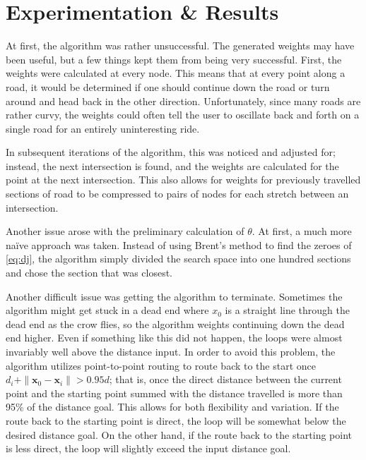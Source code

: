 \documentclass[twocolumn,12pt]{article}
\begin{document}
\section{Experimentation \& Results}

At first, the algorithm was rather unsuccessful. The generated weights may have
been useful, but a few things kept them from being very successful. First, the
weights were calculated at every node. This means that at every point along a
road, it would be determined if one should continue down the road or turn around
and head back in the other direction. Unfortunately, since many roads are rather
curvy, the weights could often tell the user to oscillate back and forth on a
single road for an entirely uninteresting ride.

In subsequent iterations of the algorithm, this was noticed and adjusted for;
instead, the next intersection is found, and the weights are calculated for the
point at the next intersection. This also allows for weights for previously
travelled sections of road to be compressed to pairs of nodes for each stretch
between an intersection.

Another issue arose with the preliminary calculation of $\theta$. At first, a
much more na\"{i}ve approach was taken. Instead of using Brent's method to find
the zeroes of \eqref{eq:dj}, the algorithm simply divided the search space into
one hundred sections and chose the section that was closest.

Another difficult issue was getting the algorithm to terminate. Sometimes the
algorithm might get stuck in a dead end where $x_0$ is a straight line through
the dead end as the crow flies, so the algorithm weights continuing down the
dead end higher. Even if something like this did not happen, the loops were
almost invariably well above the distance input. In order to avoid this problem,
the algorithm utilizes point-to-point routing to route back to the start once
$d_i + \|\bm{x}_0-\bm{x}_i\| > 0.95d$; that is, once the direct distance between
the current point and the starting point summed with the distance travelled is
more than 95\% of the distance goal. This allows for both flexibility and
variation. If the route back to the starting point is direct, the loop will be
somewhat below the desired distance goal. On the other hand, if the route back
to the starting point is less direct, the loop will slightly exceed the input
distance goal.
\end{document}
